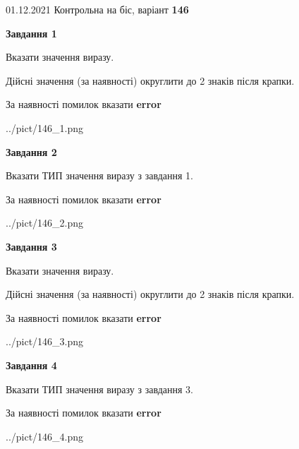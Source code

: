 \documentclass[11pt, ukrainian]{article}
\begin{document}
{01.12.2021 Контрольна на біс, варіант  \No \textbf { 146 }\par}
{
\begin {large}
{\begin {center}\textbf{Завдання 1}\end {center}}\par
Вказати значення виразу. \par
Дійсні значення (за наявності) округлити до 2 знаків після крапки. \par
За наявності помилок вказати \textbf{error}

\begin{center}
	{../pict/146_1.png}
\end{center}
\newpage

{\begin {center}\textbf{Завдання 2}\end {center}}\par
Вказати ТИП значення виразу з завдання 1. \par
За наявності помилок вказати \textbf{error}

\begin{center}
	{../pict/146_2.png}
\end{center}
\newpage

{\begin {center}\textbf{Завдання 3}\end {center}}\par
Вказати значення виразу. \par
Дійсні значення (за наявності) округлити до 2 знаків після крапки. \par
За наявності помилок вказати \textbf{error}

\begin{center}
	{../pict/146_3.png}
\end{center}
\newpage

{\begin {center}\textbf{Завдання 4}\end {center}}\par
Вказати ТИП значення виразу з завдання 3. \par
За наявності помилок вказати \textbf{error}

\begin{center}
	{../pict/146_4.png}
\end{center}
\newpage


\end{large}}
\end{document}

